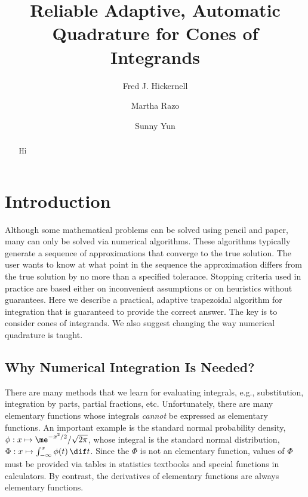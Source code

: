 \documentclass[]{amsart}
\theoremstyle{definition}
\theoremstyle{remark}
\begin{document}
\title{Reliable Adaptive, Automatic Quadrature for Cones of Integrands}
\author{Fred J. Hickernell}
\author{Martha Razo}
\author{Sunny Yun}
\maketitle 


\begin{abstract} Hi
\end{abstract}


\section{Introduction} 

Although some mathematical problems can be solved using pencil and paper, many can only be solved via numerical algorithms.  These algorithms typically generate a sequence of approximations that converge to the true solution.  The user wants to know at what point in the sequence the approximation differs from the true solution by no more than a specified tolerance. Stopping criteria used in practice are based either on inconvenient assumptions or on heuristics without guarantees.  Here we describe a practical, adaptive trapezoidal algorithm for integration that is guaranteed to provide the correct answer.  The key is to consider cones of integrands.  We also suggest changing the way numerical quadrature is taught.

\subsection{Why Numerical Integration Is Needed?}
There are many methods that we learn for evaluating integrals, e.g., substitution, integration by parts, partial fractions, etc.  Unfortunately, there are many elementary functions whose integrals \emph{cannot} be expressed as elementary functions.  An important example is the standard normal probability density, $\phi: x \mapsto \me^{-x^2/2}/\sqrt{2 \pi}$, whose integral is the standard normal distribution, $\Phi : x \mapsto \int_{-\infty}^x \phi(t) \, \dif t$.  Since the $\Phi$ is not an elementary function, values of $\Phi$ must be provided via tables in statistics textbooks and special functions in calculators. By contrast, the derivatives of elementary functions are always elementary functions.  
\end{document}
